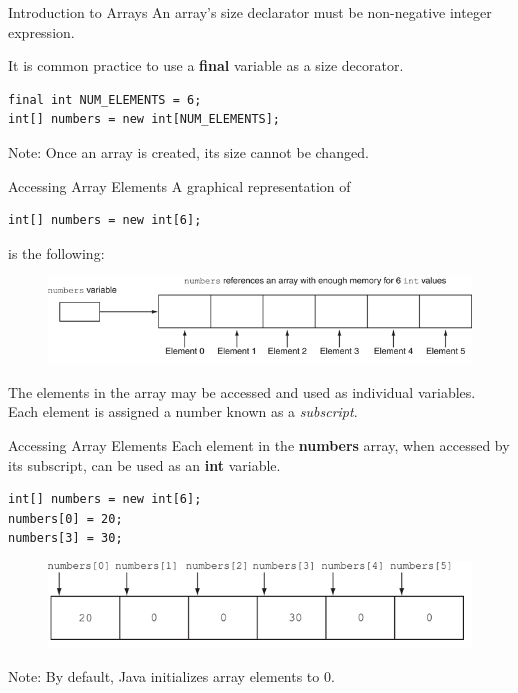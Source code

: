\documentclass[11pt]{beamer}
\begin{document}
\begin{frame}[fragile]{Introduction to Arrays}
    An array's size declarator must be non-negative integer expression. \\ \vspace{1em}

    It is common practice to use a \textbf{final} variable as a size decorator. \\ \vspace{1em}

    \begin{lstlisting}
final int NUM_ELEMENTS = 6;
int[] numbers = new int[NUM_ELEMENTS];
    \end{lstlisting}

    Note: Once an array is created, its size cannot be changed.
\end{frame}

\begin{frame}[fragile]{Accessing Array Elements}
    A graphical representation of
    \begin{lstlisting}  
int[] numbers = new int[6];
    \end{lstlisting}
    is the following:
    \noindent 
    \begin{figure}[H]
    \centering
    \includegraphics[scale=0.7]{Images/chapter07_arrayExample.png}
    \end{figure}
    The elements in the array may be accessed and used as individual variables.  \\ \vspace{1em}
    Each element is assigned a number known as a \textit{subscript}. \\ \vspace{1em}
\end{frame}

\begin{frame}[fragile]{Accessing Array Elements}
    Each element in the \textbf{numbers} array, when accessed by its subscript, can be used as an \textbf{int} variable.
    \begin{lstlisting}
int[] numbers = new int[6];
numbers[0] = 20;
numbers[3] = 30;
    \end{lstlisting}
    \noindent 
    \begin{figure}[H]
    \centering
    \includegraphics[scale=0.7]{Images/chapter07_accessingArray.png}
    \end{figure}
Note: By default, Java initializes array elements to 0.
\end{frame}
\end{document}
